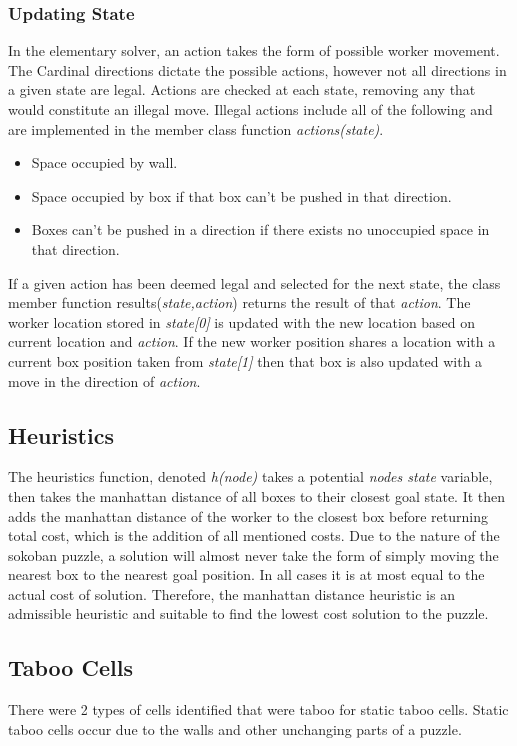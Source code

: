 \documentclass[]{article}
\begin{document}
\subsubsection{Updating State}
In the elementary solver, an action takes the form of possible worker movement. The Cardinal directions dictate the possible actions, however not all directions in a given state are legal. Actions are checked at each state, removing any that would constitute an illegal move. Illegal actions include all of the following and are implemented in the member class function \textit{actions(state)}.
\begin{itemize}
	\item Space occupied by wall.
	\item Space occupied by box if that box can't be pushed in that direction.
	\item Boxes can't be pushed in a direction if there exists no unoccupied space in that direction.
\end{itemize}
If a given action has been deemed legal and selected for the next state, the class member function results(\textit{state,action}) returns the result of that \textit{action}. The worker location stored in \textit{state[0]} is updated with the new location based on current location and \textit{action}. If the new worker position shares a location with a current box position taken from \textit{state[1]} then that box is also updated with a move in the direction of \textit{action}.
\subsection{Heuristics}
The heuristics function, denoted \textit{h(node)} takes a potential \textit{nodes state} variable, then takes the manhattan distance of all boxes to their closest goal state. It then adds the manhattan distance of the worker to the closest box before returning total cost, which is the addition of all mentioned costs. Due to the nature of the sokoban puzzle, a solution will almost never take the form of simply moving the nearest box to the nearest goal position. In all cases it is at most equal to the actual cost of solution. Therefore, the manhattan distance heuristic is an admissible heuristic and suitable to find the lowest cost solution to the puzzle. 
\subsection{Taboo Cells}
There were 2 types of cells identified that were taboo for static taboo cells. Static taboo cells occur due to the walls and other unchanging parts of a puzzle.
\end{document}
